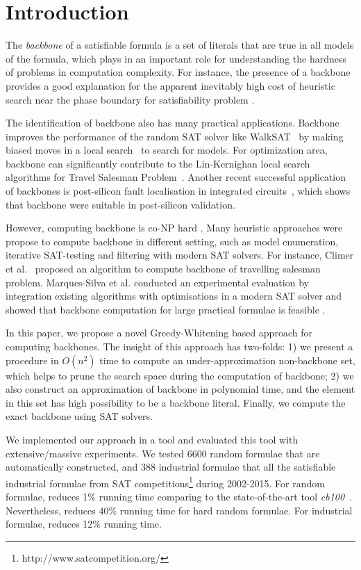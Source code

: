  

\section{Introduction}
The \textit{backbone} of a satisfiable formula is a set of literals that are true in all models of the formula,
which plays in an important role for understanding the hardness of problems in computation complexity.
For instance, the presence of a backbone provides a good explanation for the apparent inevitably high cost of heuristic search near the phase boundary  for satisfiability problem \cite{MZKST99}. 

The identification of backbone also has many practical applications. Backbone improves the performance of the random SAT solver like  WalkSAT~\cite{SBK1993} by making biased moves in a local search~\cite{ZWR2003,MAR2007} to search for models. For optimization area,  backbone can significantly contribute to the Lin-Kernighan local search algorithms for Travel Salesman Problem~\cite{ZWL2005}. Another recent successful application of backbones is post-silicon fault localisation in integrated circuits~\cite{ZWSM11,ZWM11}, which shows that backbone were suitable in post-silicon validation.

However, computing backbone is co-NP hard \cite{Jan10}.  Many heuristic approaches were propose to compute backbone in different setting, such as model enumeration, iterative SAT-testing and filtering with modern SAT solvers.
For instance, Climer et al.~\cite{CZ2002} proposed an algorithm to compute backbone of travelling salesman problem.
Marques-Silva et al.  conducted an experimental evaluation by integration existing algorithms with optimisations in a modern SAT solver and showed that backbone computation for large practical formulae is feasible \cite{MJML2010,JLMS12,JLM15}. 


In this paper, we propose a novel Greedy-Whitening based approach \tool for computing backbones. The insight of this approach has two-folds: 1) we present a procedure in $O(n^2)$ time to compute an under-approximation non-backbone set, which helps to prune the search space during the computation of backbone; 2) we also construct an approximation of backbone in polynomial time, and the element in this set has high possibility to be a backbone literal. 
Finally, we compute the exact backbone using SAT solvers.

We implemented our approach in a tool \tool and evaluated this tool with extensive/massive experiments. We tested 6600 random formulae that are automatically constructed, and 388 industrial formulae that all the satisfiable industrial formulae from SAT competitions\footnote{http://www.satcompetition.org/} during 2002-2015. For random formulae, \tool reduces 1\% running time comparing to the state-of-the-art tool \textit{cb100}~\cite{JLM15}. Nevertheless, \tool reduces 40\% running time for hard random formulae. For industrial formulae, \tool reduces 12\% running time.
 

